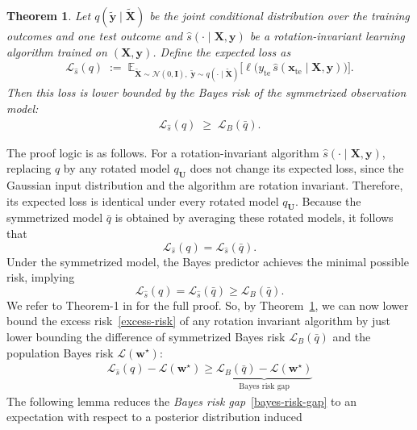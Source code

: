 \documentclass{article}
\theoremstyle{plain}
\newtheorem{theorem}{Theorem}[section]
\theoremstyle{definition}
\theoremstyle{remark}
\begin{document}
\begin{theorem}
\label{bayes-optimal-risk}
 Let $q(\tilde{\boldsymbol y}\mid \tilde{\boldsymbol X})$ be the joint conditional distribution over the training outcomes and one test outcome and
$\hat s(\cdot\mid \boldsymbol X,\boldsymbol y)$ be a rotation-invariant learning algorithm trained on $(\boldsymbol X,\boldsymbol y)$.
Define the expected loss as
\begin{align*}
\mathcal{L}_{\hat s}(q)
\;:=\;
\mathbb E_{\tilde{\boldsymbol X}\sim  \mathcal{N}(0,\mathbf{I}),\;
\tilde{\boldsymbol y}\sim q(\cdot\mid \tilde{\boldsymbol X})}
\Big[
\ell\!\big(
y_{\mathrm{te}}\,
\hat s(\boldsymbol x_{\mathrm{te}}\mid \boldsymbol X,\boldsymbol y)
\big)
\Big].
\end{align*}
Then this loss is lower bounded by the Bayes risk of the symmetrized observation model:
\begin{align}
\mathcal{L}_{\hat{s}}(q)
\;\ge\;
\mathcal{L}_B(\bar q).
\end{align}
\end{theorem}
The proof logic is as follows. For a rotation-invariant algorithm $\hat s(\cdot \mid \boldsymbol X,\boldsymbol y)$, replacing $q$ by any rotated model $q_{\boldsymbol U}$ does not change its expected loss, since the Gaussian input distribution and the algorithm are rotation invariant. Therefore, its expected loss is identical under every rotated model $q_{\boldsymbol U}$. Because the symmetrized model $\bar q$ is obtained by averaging these rotated models, it follows that
\[
\mathcal L_{\hat s}(q) = \mathcal L_{\hat s}(\bar q).
\]
Under the symmetrized model, the Bayes predictor achieves the minimal possible risk, implying
\[
\mathcal L_{\hat s}(q) = \mathcal L_{\hat s}(\bar q)\ge \mathcal L_B(\bar q).
\]
 We refer to Theorem-1 in \cite{warmuth2021case} for the full proof. So, by Theorem~\ref{bayes-optimal-risk}, we can now lower bound the excess risk~\eqref{excess-risk} of any rotation invariant algorithm by just lower bounding the difference of symmetrized Bayes risk $\mathcal{L}_B(\bar q)$ and the population Bayes risk $\mathcal{L}(\mathbf{w}^{\star})$:
\begin{align}
\label{bayes-risk-gap}
    \mathcal{L}_{\hat{s}}(q) - \mathcal{L}(\mathbf{w}^{\star}) \geq \underbrace{\mathcal{L}_B(\bar q) - \mathcal{L}(\mathbf{w}^{\star})}_{\text{Bayes risk gap}}
\end{align}
The following lemma reduces the \textit{Bayes risk gap}~\eqref{bayes-risk-gap} to an
expectation with respect to a posterior distribution induced
\end{document}
